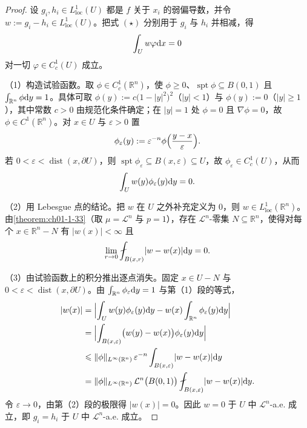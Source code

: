 \documentclass[../../main.tex]{subfiles}%
\begin{document}
\begin{proof}
设 $g_i,h_i\in L^{1}_{\mathrm{loc}}(U)$ 都是 $f$ 关于 $x_i$ 的弱偏导数，并令 $w:=g_i-h_i\in L^{1}_{\mathrm{loc}}(U)$。把式 $(\star)$ 分别用于 $g_i$ 与 $h_i$ 并相减，得
\begin{align*}
\int_{U}w\varphi\mathrm{d} x=0
\end{align*}
对一切 $\varphi\in C_c^{1}(U)$ 成立。

（1）构造试验函数。取 $\phi\in C_c^{1}(\mathbb{R}^{n})$，使 $\phi\geqslant0$、$\operatorname{spt}\phi\subseteq B(0,1)$ 且 $\int_{\mathbb{R}^{n}}\phi\mathrm{d} y=1$。具体可取 $\phi(y):=c\bigl(1-\lvert y\rvert^{2}\bigr)^{2}$（$\lvert y\rvert<1$）与 $\phi(y):=0$（$\lvert y\rvert\geqslant1$），其中常数 $c>0$ 由规范化条件确定；在 $\lvert y\rvert=1$ 处 $\phi=0$ 且 $\nabla\phi=0$，故 $\phi\in C^{1}(\mathbb{R}^{n})$。对 $x\in U$ 与 $\varepsilon>0$ 置
\begin{align*}
\phi_\varepsilon(y):=\varepsilon^{-n}\phi\Bigl(\frac{y-x}{\varepsilon}\Bigr).
\end{align*}
若 $0<\varepsilon<\operatorname{dist}(x,\partial U)$，则 $\operatorname{spt}\phi_\varepsilon\subseteq B(x,\varepsilon)\subseteq U$，故 $\phi_\varepsilon\in C_c^{1}(U)$，从而
\begin{align*}
\int_{U}w(y)\phi_\varepsilon(y)\mathrm{d} y=0 .
\end{align*}

（2）用 Lebesgue 点的结论。把 $w$ 在 $U$ 之外补充定义为 $0$，则 $w\in L^{1}_{\mathrm{loc}}(\mathbb{R}^{n})$。由\cref{theorem:ch01-1-33}（取 $\mu=\mathcal{L}^{n}$ 与 $p=1$），存在 $\mathcal{L}^{n}$-零集 $N\subseteq\mathbb{R}^{n}$，使得对每个 $x\in\mathbb{R}^{n}-N$ 有 $\lvert w(x)\rvert<\infty$ 且%
\begin{align*}
\lim_{r\to0}\fint_{B(x,r)}\lvert w-w(x)\rvert\diff y=0 .
\end{align*}

（3）由试验函数上的积分推出逐点消失。固定 $x\in U-N$ 与 $0<\varepsilon<\operatorname{dist}(x,\partial U)$。由 $\int_{\mathbb{R}^{n}}\phi_\varepsilon\mathrm{d} y=1$ 与第（1）段的等式，
\begin{align*}
\lvert w(x)\rvert
&=\Bigl\lvert\int_{U}w(y)\phi_\varepsilon(y)\diff y-w(x)\int_{\mathbb{R}^{n}}\phi_\varepsilon(y)\diff y\Bigr\rvert\\
&=\Bigl\lvert\int_{B(x,\varepsilon)}\bigl(w(y)-w(x)\bigr)\phi_\varepsilon(y)\diff y\Bigr\rvert\\
&\leqslant\lVert\phi\rVert_{L^{\infty}(\mathbb{R}^{n})}\,\varepsilon^{-n}\int_{B(x,\varepsilon)}\lvert w-w(x)\rvert\diff y\\
&=\lVert\phi\rVert_{L^{\infty}(\mathbb{R}^{n})}\,\mathcal{L}^{n}\bigl(B(0,1)\bigr)\fint_{B(x,\varepsilon)}\lvert w-w(x)\rvert\diff y .
\end{align*}
令 $\varepsilon\to0$，由第（2）段的极限得 $\lvert w(x)\rvert=0$。因此 $w=0$ 于 $U$ 中 $\mathcal{L}^{n}$-a.e. 成立，即 $g_i=h_i$ 于 $U$ 中 $\mathcal{L}^{n}$-a.e. 成立。
\end{proof}
\end{document}
